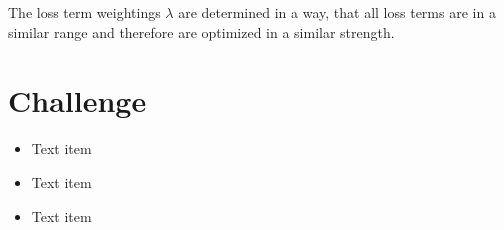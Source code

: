 \documentclass[landscape,a2,final,10pt]{issposter}
\begin{document}
\begin{multicols}{3}
\begin{small}
        The loss term weightings $\lambda$ are determined in a way, that all loss terms are in a 
        similar range and therefore are optimized in a similar strength.

        \end{small}
    \columnbreak
    \section{Challenge}
        \begin{itemize}
            \item Text item
            \item Text item
            \item Text item
        \end{itemize}
    \columnbreak
\end{multicols}
\end{document}
